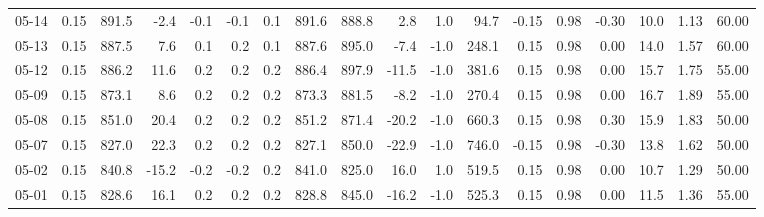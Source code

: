 \begin{threeparttable}
{\begin{tabular}{lrrrrrrrrrrrrrrrrr}
  05-14 &     0.15 & 891.5 &              -2.4 &              -0.1 &               -0.1 &                0.1 & 891.6 & 888.8 &        2.8 &                      1.0 &                94.7 &      -0.15 &      0.98 &          -0.30 &             10.0 &            1.13 &                  60.00 \\
  05-13 &     0.15 & 887.5 &               7.6 &               0.1 &                0.2 &                0.1 & 887.6 & 895.0 &       -7.4 &                     -1.0 &               248.1 &       0.15 &      0.98 &           0.00 &             14.0 &            1.57 &                  60.00 \\
  05-12 &     0.15 & 886.2 &              11.6 &               0.2 &                0.2 &                0.2 & 886.4 & 897.9 &      -11.5 &                     -1.0 &               381.6 &       0.15 &      0.98 &           0.00 &             15.7 &            1.75 &                  55.00 \\
  05-09 &     0.15 & 873.1 &               8.6 &               0.2 &                0.2 &                0.2 & 873.3 & 881.5 &       -8.2 &                     -1.0 &               270.4 &       0.15 &      0.98 &           0.00 &             16.7 &            1.89 &                  55.00 \\
  05-08 &     0.15 & 851.0 &              20.4 &               0.2 &                0.2 &                0.2 & 851.2 & 871.4 &      -20.2 &                     -1.0 &               660.3 &       0.15 &      0.98 &           0.30 &             15.9 &            1.83 &                  50.00 \\
  05-07 &     0.15 & 827.0 &              22.3 &               0.2 &                0.2 &                0.2 & 827.1 & 850.0 &      -22.9 &                     -1.0 &               746.0 &      -0.15 &      0.98 &          -0.30 &             13.8 &            1.62 &                  50.00 \\
  05-02 &     0.15 & 840.8 &             -15.2 &              -0.2 &               -0.2 &                0.2 & 841.0 & 825.0 &       16.0 &                      1.0 &               519.5 &       0.15 &      0.98 &           0.00 &             10.7 &            1.29 &                  50.00 \\
  05-01 &     0.15 & 828.6 &              16.1 &               0.2 &                0.2 &                0.2 & 828.8 & 845.0 &      -16.2 &                     -1.0 &               525.3 &       0.15 &      0.98 &           0.00 &             11.5 &            1.36 &                  55.00 \\

\end{tabular}}
\end{threeparttable}
